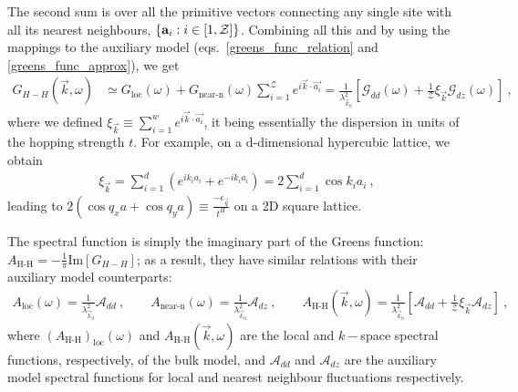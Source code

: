 \documentclass[reprint,hidelinks]{revtex4-2}
\begin{document}
The second sum is over all the primitive vectors connecting any single site with all its nearest neighbours, $\left\{ {\bf a}_i: i \in \left[1, \mathcal{Z}\right]\right\}$. Combining all this and by using the mappings to the auxiliary model (eqs.~\ref{greens_func_relation} and \ref{greens_func_approx}), we get
\begin{equation}\begin{aligned}
	\label{k_Gf_siam}
	G_{H-H} (\vec k, \omega) &\simeq G_\text{loc}(\omega) + G_\text{near-n}(\omega)\sum_{i=1}^{\mathcal{Z}} e^{i \vec{k}\cdot\vec {a_i}} = \frac{1}{\lambda_{\vec k_0}^2}\left[\mathcal{G}_{dd}(\omega) + \frac{1}{\mathcal{Z}}\xi_{\vec k}\mathcal{G}_{dz}(\omega) \right]~,
\end{aligned}\end{equation}
where we defined \(\xi_{\vec k} \equiv \sum_{i=1}^w e^{i \vec{k}\cdot\vec {a_i}}\), it being essentially the dispersion in units of the hopping strength \(t\). For example, on a d-dimensional hypercubic lattice, we obtain
\begin{equation}\begin{aligned}
	\xi_{\vec k} = \sum_{i=1}^d \left(e^{i k_i {a_i}} + e^{-i k_i {a_i}}\right) = 2\sum_{i=1}^d \cos k_i a_i~,
\end{aligned}\end{equation}
leading to \(2(\cos q_{x}a + \cos q_{y}a)\equiv \frac{-\epsilon_{\vec{q}}}{t^{H}}\) on a 2D square lattice. 

The spectral function is simply the imaginary part of the Greens function: \(A_\text{H-H} = -\frac{1}{\pi}\text{Im}\left[G_{H-H}\right] \); as a result, they have similar relations with their auxiliary model counterparts:
\begin{equation}\begin{aligned}
	A_\text{loc}(\omega) = \frac{1}{\lambda_{\vec k_0}^2}\mathcal{A}_{dd}~,\qquad A_\text{near-n}(\omega) = \frac{1}{\lambda_{\vec k_0}^2}\mathcal{A}_{dz}~,\qquad A_\text{H-H}(\vec{k},\omega) = \frac{1}{\lambda_{\vec k_0}^2}\left[\mathcal{A}_{dd} + \frac{1}{\mathcal{Z}}\xi_{\vec k}\mathcal{A}_{dz} \right]~,
\end{aligned}\end{equation}
where \(\left(A_\text{H-H}\right)_\text{loc}(\omega)\) and \(A_\text{H-H}(\vec{k},\omega)\) are the local and \(k-\)space spectral functions, respectively, of the bulk model, and \(\mathcal{A}_{dd}\) and \(\mathcal{A}_{dz}\) are the auxiliary model spectral functions for local and nearest neighbour fluctuations respectively.
\end{document}

